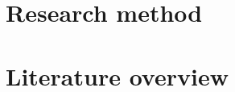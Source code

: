 \documentclass[12pt]{report}
\begin{document}
\section{Research method}


\section{Literature overview} %
\end{document}
